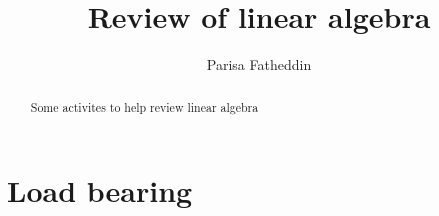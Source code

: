 \documentclass{xourse}
\author{Parisa Fatheddin}
\title{Review of linear algebra}
\begin{document}
\begin{abstract}
    Some activites to help review linear algebra
\end{abstract}
\maketitle

\part{Load bearing}

\end{document}
